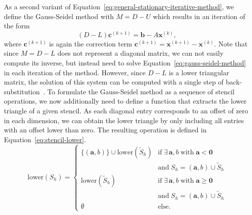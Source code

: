 As a second variant of Equation~\eqref{eq:general-stationary-iterative-method}, we define the Gauss-Seidel method with $M = D - U$ which results in an iteration of the form
\begin{equation}
	(D - L) \bm{c}^{(k+1)} = \bm{b} - A \bm{x}^{(k)}, 
	\label{eq:gauss-seidel-method}
\end{equation}
where $\bm{c}^{(k+1)}$ is again the correction term $\bm{c}^{(k+1)} = \bm{x}^{(k+1)} - \bm{x}^{(k)}$.
Note that since $M = D - L$ does not represent a diagonal matrix, we can not easily compute its inverse, but instead need to solve Equation~\eqref{eq:gauss-seidel-method} in each iteration of the method.
However, since $D - L$ is a lower triangular matrix, the solution of this system can be computed with a single step of back-substitution~\cite{saad2003iterative}. 
To formulate the Gauss-Seidel method as a sequence of stencil operations, we now additionally need to define a function that extracts the lower triangle of a given stencil.
As each diagonal entry corresponds to an offset of zero in each dimension, we can obtain the lower triangle by only including all entries with an offset lower than zero.
The resulting operation is defined in Equation~\eqref{eq:stencil-lower}.
\begin{equation}
	\text{lower}(S_h) = \begin{cases}
		\{(\bm{a}, b) \} \cup \text{lower}(\tilde{S}_h) & \text{if} \; \exists\, \bm a, b \; \text{with} \; \bm a < \bm 0 \\ & \text{and} \; S_h = (\bm a, b) \cup \tilde{S}_h \\
		\text{lower}(\tilde{S}_h) & \text{if} \; \exists\, \bm a, b \; \text{with} \; \bm a \geq \bm 0 \\ & \text{and} \; S_h = (\bm a, b) \cup \tilde{S}_h \\
		\emptyset & \text{else}.
	\end{cases}
	\label{eq:stencil-lower}
\end{equation}

